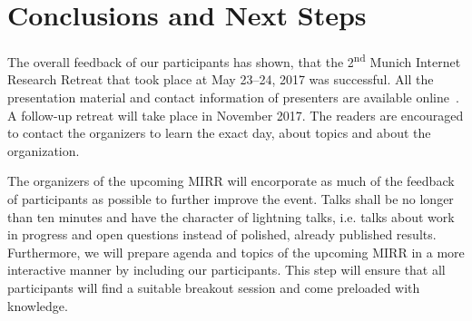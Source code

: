\section{Conclusions and Next Steps}\label{sec:conclusion}


The overall feedback of our participants has shown, that the 2\textsuperscript{nd} Munich Internet Research Retreat that took place at May 23--24, 2017 was successful. All the presentation material and contact
information of presenters are available online~\cite{mir-materials}. A follow-up retreat will take place in November 2017. The
readers are encouraged to contact the organizers to learn the exact day, about topics and about the organization.

The organizers of the upcoming \ac{MIRR} will encorporate as much of the feedback of participants as possible to further improve the event. Talks shall be no longer than ten minutes and have the character of lightning talks, i.e. talks about work in progress and open questions instead of polished, already published results. Furthermore, we will prepare agenda and topics of the upcoming \ac{MIRR} in a more interactive manner by including our participants. This step will ensure that all participants will find a suitable breakout session and come preloaded with knowledge.
